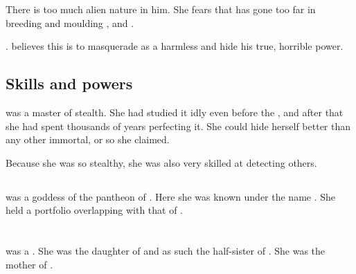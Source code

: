 There is too much alien \xs{} nature in him. 
She fears that \Secherdamon{} has gone too far in breeding and moulding \Vizsherioch, and . 

\Vizsherioch{} . 
\Nzessuacrith{} believes this is to masquerade as a harmless \scatha{} and hide his true, horrible power. 









\subsection{Skills and powers}
\Nzessuacrith was a master of stealth.
She had studied it idly even before the \secondbanewar, and after that she had spent thousands of years perfecting it. 
She could hide herself better than any other immortal, or so she claimed.

Because she was so stealthy, she was also very skilled at detecting others.









\subsection{\Usherain}
\Nzessuacrith was a goddess of the  pantheon of . 
Here she was known under the name \Usherain. 
She held a portfolio overlapping with that of . 















\section{\DiorethRephexsar}
\DiorethSethicusRephexsar was a \dragon.
She was the daughter of \ValcanSethicus and as such the half-sister of \RaemythNexagglachel.
She was the mother of \NarucOsanggrath. 









